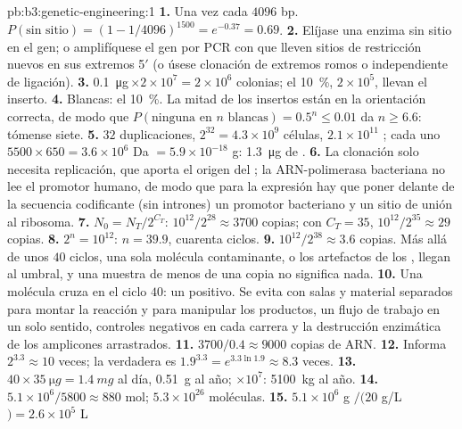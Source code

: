 \begin{solution}{pb:b3:genetic-engineering:1}
\textbf{1.} Una vez cada $4096$ bp. $P(\text{sin sitio}) = (1 - 1/4096)^{1500}
= e^{-0.37} = 0.69$.
\textbf{2.} Elíjase una enzima sin sitio en el gen; o amplifíquese el gen
por PCR con  que lleven sitios de restricción nuevos en sus
extremos 5$'$ (o úsese clonación de extremos romos o independiente de
ligación).
\textbf{3.} \qty{0.1}{\micro g}\,$\times 2\times 10^{7} = 2\times
10^{6}$ colonias; el \qty{10}{\%}, $2\times 10^{5}$, llevan el inserto.
\textbf{4.} Blancas: el \qty{10}{\%}. La mitad de los insertos están en
la orientación correcta, de modo que
$P(\text{ninguna en } n \text{ blancas}) = 0.5^{n} \le 0.01$ da
$n \ge 6.6$: tómense siete.
\textbf{5.} $32$ duplicaciones, $2^{32} = 4.3\times 10^{9}$ células,
$2.1\times
10^{11}$ ; cada uno $5500\times 650 = 3.6\times 10^{6}$ Da $=
5.9\times 10^{-18}$ g: \qty{1.3}{\micro g} de .
\textbf{6.} La clonación solo necesita replicación, que aporta el origen
del ; la ARN-polimerasa bacteriana no lee el promotor humano, de
modo que para la expresión hay que poner delante de la secuencia
codificante (sin intrones) un promotor bacteriano y un sitio de unión al
ribosoma.
\textbf{7.} $N_{0} = N_{T}/2^{C_{T}}$: $10^{12}/2^{28} \approx 3700$
copias; con $C_{T} = 35$, $10^{12}/2^{35} \approx 29$ copias.
\textbf{8.} $2^{n} = 10^{12}$: $n = 39.9$, cuarenta ciclos.
\textbf{9.} $10^{12}/2^{38} \approx 3.6$ copias. Más allá de unos $40$
ciclos, una sola molécula contaminante, o los artefactos de los
, llegan al umbral, y una muestra de menos de una copia no
significa nada.
\textbf{10.} Una molécula cruza en el ciclo $40$: un positivo. Se evita
con salas y material separados para montar la reacción y para manipular
los productos, un flujo de trabajo en un solo sentido, controles
negativos en cada carrera y la destrucción enzimática de los amplicones
arrastrados.
\textbf{11.} $3700/0.4 \approx 9000$ copias de ARN.
\textbf{12.} Informa $2^{3.3} \approx 10$ veces; la verdadera es
$1.9^{3.3} =
e^{3.3\ln 1.9} \approx 8.3$ veces.
\textbf{13.} $40\times \qty{35}{\micro g} = \qty{1.4}{mg}$ al día,
\qty{0.51}{g} al año; $\times 10^{7}$: \qty{5100}{kg} al año.
\textbf{14.} $5.1\times 10^{6}/5800 \approx 880$ mol; $5.3\times 10^{26}$
moléculas.
\textbf{15.} $5.1\times 10^{6}$ g $/ (20$ g/L$) = 2.6\times 10^{5}$ L

\end{solution}
